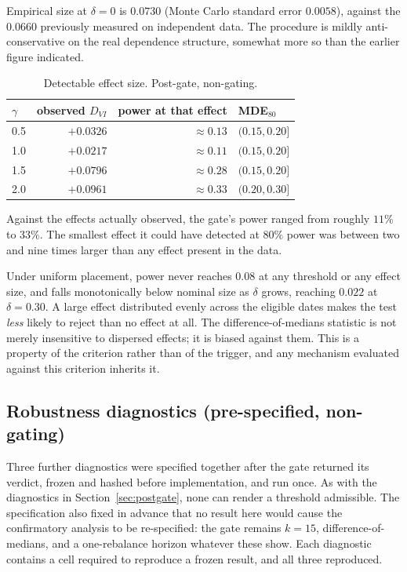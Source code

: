 \documentclass[12pt,letterpaper]{article}
\begin{document}
Empirical size at $\delta = 0$ is $0.0730$ (Monte Carlo standard error $0.0058$), against
the $0.0660$ previously measured on independent data. The procedure is mildly
anti-conservative on the real dependence structure, somewhat more so than the earlier
figure indicated.

\begin{table}[h]
\centering
\caption{Detectable effect size. Post-gate, non-gating.}
\label{tab:mde}
\small
\begin{tabular}{lrrl}
\toprule
$\gamma$ & observed $D_{VI}$ & power at that effect & MDE$_{80}$ \\
\midrule
0.5 & $+0.0326$ & $\approx 0.13$ & $(0.15, 0.20]$ \\
1.0 & $+0.0217$ & $\approx 0.11$ & $(0.15, 0.20]$ \\
1.5 & $+0.0796$ & $\approx 0.28$ & $(0.15, 0.20]$ \\
2.0 & $+0.0961$ & $\approx 0.33$ & $(0.20, 0.30]$ \\
\bottomrule
\end{tabular}
\end{table}

Against the effects actually observed, the gate's power ranged from roughly $11\%$ to
$33\%$. The smallest effect it could have detected at $80\%$ power was between two and
nine times larger than any effect present in the data.

Under uniform placement, power never reaches $0.08$ at any threshold or any effect size,
and falls monotonically below nominal size as $\delta$ grows, reaching $0.022$ at
$\delta = 0.30$. A large effect distributed evenly across the eligible dates makes the
test \emph{less} likely to reject than no effect at all. The difference-of-medians
statistic is not merely insensitive to dispersed effects; it is biased against them. This
is a property of the criterion rather than of the trigger, and any mechanism evaluated
against this criterion inherits it.

\subsection{Robustness diagnostics (pre-specified, non-gating)}
\label{sec:robustness}

Three further diagnostics were specified together after the gate returned its verdict,
frozen and hashed before implementation, and run once. As with the diagnostics in
Section~\ref{sec:postgate}, none can render a threshold admissible. The specification
also fixed in advance that no result here would cause the confirmatory analysis to be
re-specified: the gate remains $k = 15$, difference-of-medians, and a one-rebalance
horizon whatever these show. Each diagnostic contains a cell required to reproduce a frozen result, and all three
reproduced.
\end{document}
